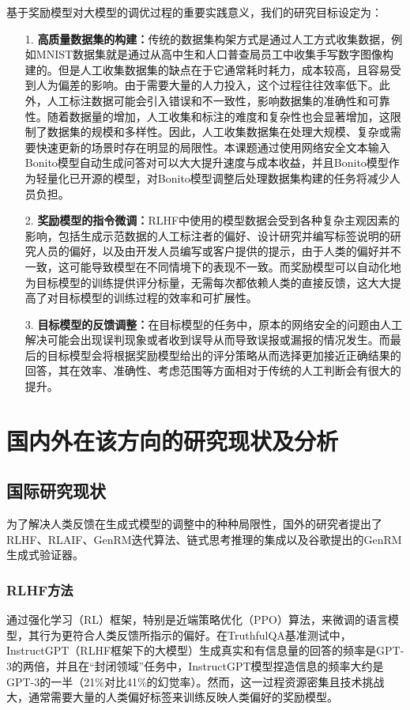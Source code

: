 基于奖励模型对大模型的调优过程的重要实践意义，我们的研究目标设定为：
\begin{itemize}
    \item[1.] \textbf{高质量数据集的构建：}传统的数据集构架方式是通过人工方式收集数据，例如MNIST数据集就是通过从高中生和人口普查局员工中收集手写数字图像构建的。但是人工收集数据集的缺点在于它通常耗时耗力，成本较高，且容易受到人为偏差的影响。由于需要大量的人力投入，这个过程往往效率低下。此外，人工标注数据可能会引入错误和不一致性，影响数据集的准确性和可靠性。随着数据量的增加，人工收集和标注的难度和复杂性也会显著增加，这限制了数据集的规模和多样性。因此，人工收集数据集在处理大规模、复杂或需要快速更新的场景时存在明显的局限性。本课题通过使用网络安全文本输入Bonito模型自动生成问答对可以大大提升速度与成本收益，并且Bonito模型作为轻量化已开源的模型，对Bonito模型调整后处理数据集构建的任务将减少人员负担。
    \item[2.] \textbf{奖励模型的指令微调：}RLHF中使用的模型数据会受到各种复杂主观因素的影响，包括生成示范数据的人工标注者的偏好、设计研究并编写标签说明的研究人员的偏好，以及由开发人员编写或客户提供的提示，由于人类的偏好并不一致，这可能导致模型在不同情境下的表现不一致。而奖励模型可以自动化地为目标模型的训练提供评分标量，无需每次都依赖人类的直接反馈，这大大提高了对目标模型的训练过程的效率和可扩展性。
    \item[3.] \textbf{目标模型的反馈调整：}在目标模型的任务中，原本的网络安全的问题由人工解决可能会出现误判现象或者收到误导从而导致误报或漏报的情况发生。而最后的目标模型会将根据奖励模型给出的评分策略从而选择更加接近正确结果的回答，其在效率、准确性、考虑范围等方面相对于传统的人工判断会有很大的提升。
\end{itemize}

\section{国内外在该方向的研究现状及分析}
\subsection{国际研究现状}
为了解决人类反馈在生成式模型的调整中的种种局限性，国外的研究者提出了RLHF、RLAIF、GenRM迭代算法、链式思考推理的集成以及谷歌提出的GenRM生成式验证器。
\subsubsection{RLHF方法}
通过强化学习（RL）框架，特别是近端策略优化（PPO）算法，来微调的语言模型，其行为更符合人类反馈所指示的偏好。在TruthfulQA基准测试中\cite{ouyang2022training}，InstructGPT（RLHF框架下的大模型）生成真实和有信息量的回答的频率是GPT-3的两倍，并且在“封闭领域”任务中，InstructGPT模型捏造信息的频率大约是GPT-3的一半（21\%对比41\%的幻觉率）。然而，这一过程资源密集且技术挑战大\cite{mahan2024generative}，通常需要大量的人类偏好标签来训练反映人类偏好的奖励模型。
